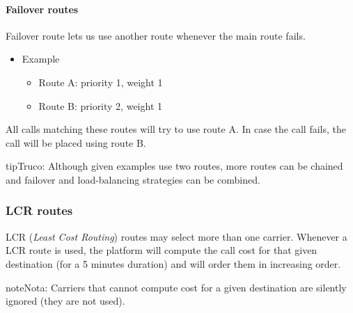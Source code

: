 \documentclass[letterpaper,10pt,spanish]{sphinxmanual}
\begin{document}
\paragraph{Failover routes}
\label{administration_portal/brand/routing/outgoing_routings:failover-routes}
Failover route lets us use another route whenever the main route fails.
\begin{itemize}
\item {} 
Example
\begin{itemize}
\item {} 
Route A: priority 1, weight 1

\item {} 
Route B: priority 2, weight 1

\end{itemize}

\end{itemize}

All calls matching these routes will try to use route A. In case the call fails,
the call will be placed using route B.

\begin{notice}{tip}{Truco:}
Although given examples use two routes, more routes can be chained and
failover and load-balancing strategies can be combined.
\end{notice}


\subsubsection{LCR routes}
\label{administration_portal/brand/routing/outgoing_routings:lcr-routes}
LCR (\emph{Least Cost Routing}) routes may select more than one carrier. Whenever a LCR route is used, the platform will compute the call cost for that
given destination (for a 5 minutes duration) and will order them in increasing order.

\begin{notice}{note}{Nota:}
Carriers that cannot compute cost for a given destination are silently ignored (they are not used).
\end{notice}
\end{document}

